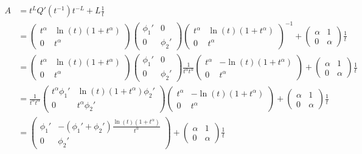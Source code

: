 \begin{align*}
  A&=t^LQ'(t^{-1})t^{-L}+L\frac{1}{t}
  \\&= \begin{pmatrix}
    t^\alpha & \ln(t)(1+t^\alpha)
    \\0 & t^\alpha
  \end{pmatrix} \begin{pmatrix}
    \phi_1' & 0 \\ 0 & \phi_2'
  \end{pmatrix} \begin{pmatrix}
    t^\alpha & \ln(t)(1+t^\alpha)
    \\0 & t^\alpha
  \end{pmatrix}^{-1}
  +
  \begin{pmatrix} \alpha & 1 \\ 0 & \alpha \end{pmatrix} \frac{1}{t}
  \\&= \begin{pmatrix}
    t^\alpha & \ln(t)(1+t^\alpha)
    \\0 & t^\alpha
  \end{pmatrix} \begin{pmatrix}
    \phi_1' & 0 \\ 0 & \phi_2'
  \end{pmatrix} 
  \frac{1}{t^\alpha t^\alpha}
  \begin{pmatrix}
    t^\alpha & -\ln(t)(1+t^\alpha)
    \\ 0 & t^\alpha
  \end{pmatrix}
  +
  \begin{pmatrix} \alpha & 1 \\ 0 & \alpha \end{pmatrix} \frac{1}{t}
  \\&= \frac{1}{t^\alpha t^\alpha} \begin{pmatrix}
    t^\alpha \phi_1' & \ln(t)(1+t^\alpha)\phi_2'
    \\0 & t^\alpha \phi_2'
  \end{pmatrix} 
  \begin{pmatrix}
    t^\alpha & -\ln(t)(1+t^\alpha)
    \\ 0 & t^\alpha
  \end{pmatrix}
  +
  \begin{pmatrix} \alpha & 1 \\ 0 & \alpha \end{pmatrix} \frac{1}{t}
  \\&= \begin{pmatrix}
    \phi_1' & -(\phi_1'+\phi_2')\frac{\ln(t)(1+t^\alpha)}{t^\alpha}
    \\0 & \phi_2'
  \end{pmatrix} 
  +
  \begin{pmatrix} \alpha & 1 \\ 0 & \alpha \end{pmatrix} \frac{1}{t}
\end{align*}
